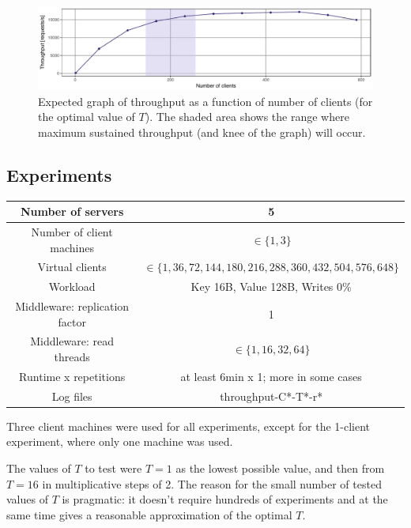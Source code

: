 \documentclass[11pt]{article}
\begin{document}
\begin{figure}[h]
\centering
\includegraphics[width=\textwidth]{figures/hypothesis_throughput.pdf}
\caption{Expected graph of throughput as a function of number of clients (for the optimal value of $T$). The shaded area shows the range where maximum sustained throughput (and knee of the graph) will occur.}
\label{fig:exp1:hyp:throughput}
\end{figure}

\subsection{Experiments}
\begin{center}
\small{
\smallskip
\begin{tabular}{|c|c|}
\hline Number of servers & 5 \\ 
\hline Number of client machines & $\in \{1, 3\}$ \\ 
\hline Virtual clients & $\in \{1, 36, 72, 144, 180, 216, 288, 360, 432, 504, 576, 648\}$ \\ 
\hline Workload & Key 16B, Value 128B, Writes 0\% \\
\hline Middleware: replication factor & 1 \\ 
\hline Middleware: read threads & $\in\{1, 16, 32, 64\}$ \\ 
\hline Runtime x repetitions & at least 6min x 1; more in some cases \\ 
\hline Log files & throughput-C*-T*-r* \\
\hline 
\end{tabular} }
\end{center}

Three client machines were used for all experiments, except for the 1-client experiment, where only one machine was used.

The values of $T$ to test were $T=1$ as the lowest possible value, and then from $T=16$ in multiplicative steps of 2. The reason for the small number of tested values of $T$ is pragmatic: it doesn't require hundreds of experiments and at the same time gives a reasonable approximation of the optimal $T$.
\end{document}
